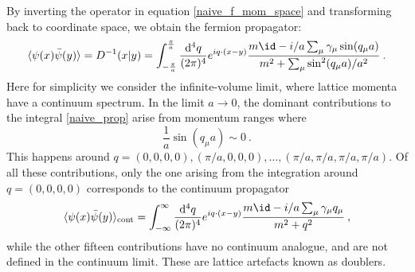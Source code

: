 By inverting  the operator in equation \ref{naive_f_mom_space} and transforming back to coordinate space, we obtain the fermion propagator:
\begin{equation}
\langle \psi(x) \bar \psi(y) \rangle = D^{-1}(x \vert y) = \int_{-\frac{\pi}{a}}^{\frac{\pi}{a}} \frac{\mathrm{d}^4 q}{(2 \pi)^4} e^{iq\cdot (x-y)}  \frac{m \id -i/a \sum_{\mu} \gamma_{\mu} \sin (q_{\mu} a)}{m^2 + \sum_{\mu}  \sin^2(q_{\mu}a)/a^2} \: .
\label{naive_prop}
\end{equation}
%
Here for simplicity we consider the infinite-volume limit, where lattice momenta have a continuum spectrum. In the limit $a \to 0$, the dominant contributions to the integral \ref{naive_prop} arise from momentum ranges where
\begin{equation}
\frac{1}{a} \sin(q_{\mu}a) \sim 0 \: .
\end{equation}
%
This happens around $q = (0,0,0,0), (\pi/a,0,0,0), \dots , (\pi/a,\pi/a,\pi/a,\pi/a)$. Of all these contributions, only the one arising from the integration around $q = (0,0,0,0)$ corresponds to the continuum propagator
\begin{equation}
\langle \psi(x) \bar \psi(y) \rangle_{\mathrm{cont}} = \int_{-\infty}^{\infty} \frac{\mathrm{d}^4 q}{(2 \pi)^4} e^{iq\cdot (x-y)}  \frac{m \id -i/a \sum_{\mu} \gamma_{\mu} q_{\mu}}{m^2 +  q^2} \: ,
\end{equation}
%
while the other fifteen contributions have no continuum analogue, and are not defined in the continuum limit. These are lattice artefacts known as doublers.  


